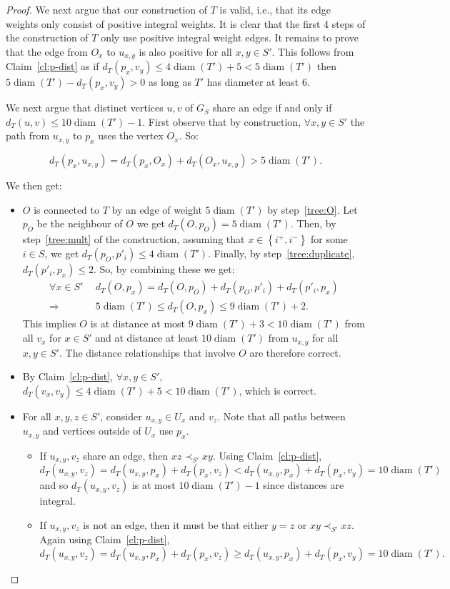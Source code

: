 \documentclass[11pt, letter]{article}
\theoremstyle{remark}
\DeclareMathOperator{\diam}{diam}
\newcommand{\set}[1]{\left\{#1\right\}}
\begin{document}
\begin{proof}
    We next argue that our construction of $T$ is valid, i.e., that its edge weights only consist of positive integral weights.  It is clear that the first 4 steps of the construction of $T$ only use positive integral weight edges. It remains to prove that the edge from $O_x$ to $u_{x,y}$ is also positive for all $x, y \in S'$. This follows from Claim~\ref{cl:p-dist} as if $d_T(p_x,v_y)\leq 4\diam(T')+5< 5\diam(T')$ then $5\diam(T')-d_T(p_x,v_y)>0$ as long as $T'$ has diameter at least $6$.

    We next argue that distinct vertices $u, v$ of $G_S$ share an edge if and only if $d_T(u, v) \leq 10 \diam(T') - 1$.  First observe that 
    by construction, $\forall x,y\in S'$ the path from $u_{x,y}$ to $p_x$ uses the vertex $O_x$. So: 

    $$d_{T}(p_x,u_{x,y})=d_{T}(p_x,O_x)+d_{T}(O_x,u_{x,y})>5\diam(T').$$ 

    We then get:
    
    \begin{itemize}
        \item $O$ is connected to $T$ by an edge of weight $5\diam(T')$ by step~\ref{tree:O}. Let $p_O$ be the neighbour of $O$ we get $d_T(O,p_O)=5\diam(T')$. Then, by step~\ref{tree:mult} of the construction, assuming that $x\in \set{i^+,i^-}$ for some $i\in S$, we get $d_T(p_O,p'_i)\leq 4\diam(T')$. Finally, by step~\ref{tree:duplicate}, $d_T(p'_i,p_x)\leq 2$. So, by combining these we get: 
        \begin{align*}
            \forall x\in S' \ \  &d_{T}(O,p_x)=d_T(O,p_O)+d_T(p_O,p'_i)+d_T(p'_i,p_x)\\
            \Longrightarrow\ \ & 5\diam(T')\leq d_T(O,p_x)\leq 9\diam(T')+2.
        \end{align*}
        This implies $O$ is at distance at most $9\diam(T')+3<10\diam(T')$ from all $v_x$ for $x\in S'$ and at distance at least $10\diam(T')$ from $u_{x,y}$ for all $x,y\in S'$.  The distance relationships that involve $O$ are therefore correct.
        \item By Claim~\ref{cl:p-dist}, $\forall x,y\in S'$, $d_{T}(v_x,v_y)\leq 4\diam(T')+5<10\diam(T')$, which is correct.
        \item For all $x, y, z \in S'$, consider $u_{x, y} \in U_x$ and $v_z$.  Note that all paths between $u_{x,y}$ and vertices outside of $U_x$  use $p_x$. 
        \begin{itemize}
            \item If $u_{x, y}, v_z$ share an edge, then $xz\prec_{S'}xy$.  Using Claim~\ref{cl:p-dist}, 
            $$
            d_T(u_{x,y}, v_z) = d_T(u_{x,y}, p_x) + d_T(p_x, v_z) < d_T(u_{x,y},p_x) + d_T(p_x,v_y) = 10 \diam(T')
            $$
            and so $d_T(u_{x,y}, v_z)$ is at most $10 \diam(T') - 1$ since distances are integral. 
            \item If $u_{x, y}, v_z$ is not an edge, then it must be that either $y=z$ or $xy\prec_{S'}xz$. Again using Claim~\ref{cl:p-dist}, 
            $$
            d_T(u_{x,y}, v_z) = d_T(u_{x,y}, p_x) + d_T(p_x, v_z) \geq d_T(u_{x,y},p_x) + d_T(p_x,v_y) = 10 \diam(T').
            $$
        \end{itemize} 
        

\end{itemize}
\end{proof}
\end{document}
